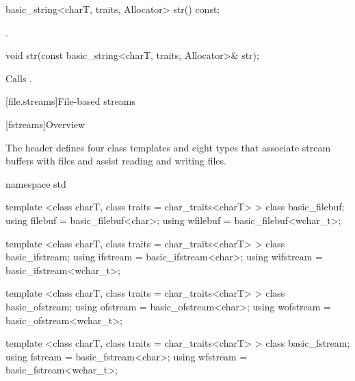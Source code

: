 %
\begin{itemdecl}
basic_string<charT, traits, Allocator> str() const;
\end{itemdecl}

\begin{itemdescr}
\pnum
\returns
{}.
\end{itemdescr}

%
%
\begin{itemdecl}
void str(const basic_string<charT, traits, Allocator>& str);
\end{itemdecl}

\begin{itemdescr}
\pnum
\effects
Calls
.
\end{itemdescr}

[file.streams]{File-based streams}

[fstreams]{Overview}

\pnum
The header
defines four class templates and eight types
that associate stream buffers with files and assist
reading and writing files.

%
%
%
%
%
%
%
%
%
%
%
%
%
\begin{codeblock}
namespace std {
  template <class charT, class traits = char_traits<charT> >
    class basic_filebuf;
  using filebuf  = basic_filebuf<char>;
  using wfilebuf = basic_filebuf<wchar_t>;

  template <class charT, class traits = char_traits<charT> >
    class basic_ifstream;
  using ifstream  = basic_ifstream<char>;
  using wifstream = basic_ifstream<wchar_t>;

  template <class charT, class traits = char_traits<charT> >
    class basic_ofstream;
  using ofstream  = basic_ofstream<char>;
  using wofstream = basic_ofstream<wchar_t>;

  template <class charT, class traits = char_traits<charT> >
    class basic_fstream;
  using fstream  = basic_fstream<char>;
  using wfstream = basic_fstream<wchar_t>;
}
\end{codeblock}

